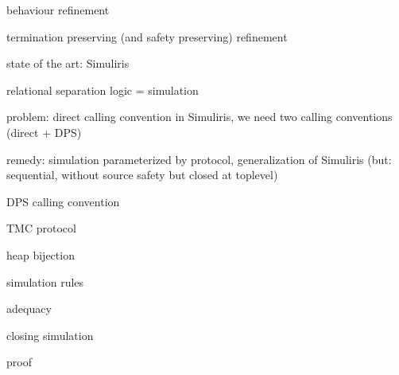 behaviour refinement

termination preserving (and safety preserving) refinement

state of the art: Simuliris


%
%
%

relational separation logic = simulation

problem: direct calling convention in Simuliris, we need two calling conventions (direct + DPS)

remedy: simulation parameterized by protocol, generalization of Simuliris (but: sequential, without source safety but closed at toplevel)

DPS calling convention

TMC protocol

heap bijection

simulation rules

adequacy

closing simulation

proof